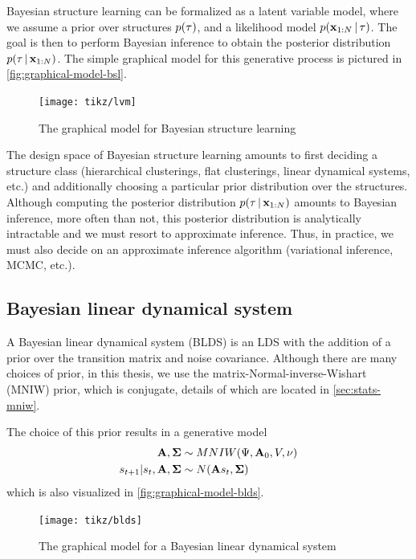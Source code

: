 Bayesian structure learning can be formalized
as a latent variable model,
where we assume a prior over structures $p(\tau)$,
and a likelihood model $p(\mathbf{x}_{1:N} \,|\, \tau)$.
The goal is then to perform Bayesian
inference to obtain the posterior distribution $p(\tau \,|\, \mathbf{x}_{1:N})$. The simple graphical model for this generative process is pictured in \autoref{fig:graphical-model-bsl}.

\begin{figure}[htp!]
    \centering
    \texttt{[image: tikz/lvm]}
    \caption{The graphical model for Bayesian structure learning}
    \label{fig:graphical-model-bsl}
\end{figure}

The design space of Bayesian structure learning
amounts to first deciding a structure class (hierarchical clusterings, flat clusterings, linear dynamical systems, etc.) and additionally choosing a
particular prior distribution over the structures.
Although computing the posterior distribution $p(\tau \,|\, \mathbf{x}_{1:N})$ amounts to Bayesian inference,
more often than not, this posterior distribution is analytically intractable and we must resort to
approximate inference. Thus, in practice, we must
also decide on an approximate inference algorithm (variational inference, MCMC, etc.).

\subsection{Bayesian linear dynamical system}

A Bayesian linear dynamical system (BLDS)
is an LDS with the addition of a prior
over the transition matrix and noise covariance. 
Although there are many choices of prior,
in this thesis, we use the matrix-Normal-inverse-Wishart (MNIW) prior, which is conjugate, details of which
are located in \autoref{sec:stats-mniw}.

The choice of this prior results in a generative model
\begin{align*}
    \mathbf{A}, \bm{\Sigma} &\sim MNIW(\Psi, \mathbf{A}_0, V, \nu) \\
    s_{t + 1} | s_t, \mathbf{A}, \bm{\Sigma} &\sim N(\mathbf{A} s_t, \bm{\Sigma})
\end{align*}
which is also visualized in \autoref{fig:graphical-model-blds}.

\begin{figure}[htp!]
    \centering
    \texttt{[image: tikz/blds]}
    \caption{The graphical model for a Bayesian linear dynamical system}
    \label{fig:graphical-model-blds}
\end{figure}

